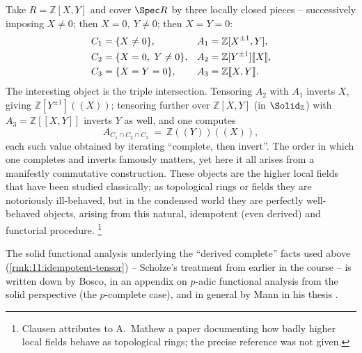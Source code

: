 \begin{example}
\label{ex:11:higher-local-fields}
Take $R=\mathbb{Z}[X,Y]$ and cover $\Spec R$ by three locally closed pieces
-- successively imposing $X\neq0$; then $X=0,\ Y\neq0$; then $X=Y=0$:
\begin{align}
\label{eq:11:hlf-pieces}
C_{1}&=\{X\neq 0\}, & A_{1}&=\mathbb{Z}[X^{\pm1},Y],\notag\\
C_{2}&=\{X=0,\ Y\neq 0\}, & A_{2}&=\mathbb{Z}[Y^{\pm1}][\![X]\!],\\
C_{3}&=\{X=Y=0\}, & A_{3}&=\mathbb{Z}[\![X,Y]\!].\notag
\end{align}
The interesting object is the triple intersection. Tensoring $A_{2}$ with
$A_{1}$ inverts $X$, giving $\mathbb{Z}[Y^{\pm1}](\!(X)\!)$; tensoring further
over $\mathbb{Z}[X,Y]$ (in $\Solid_{\mathbb{Z}}$) with $A_{3}=\mathbb{Z}[\![X,Y]
\!]$ inverts $Y$ as well, and one computes
\begin{equation*}
A_{C_{1}\cap C_{2}\cap C_{3}}\ =\ \mathbb{Z}(\!(Y)\!)(\!(X)\!),
\end{equation*}
each such value obtained by iterating ``complete, then invert''. The order in
which one completes and inverts famously matters, yet here it all arises from a
manifestly commutative construction. These objects are the higher local fields
that have been studied classically; as topological rings or fields they are
notoriously ill-behaved, but in the condensed world they are perfectly
well-behaved objects, arising from this natural, idempotent (even derived) and
functorial procedure.%
\footnote{Clausen attributes to A.~Mathew a paper documenting how badly higher
local fields behave as topological rings; the precise reference was not given.}
\end{example}

\begin{remark}
\label{rmk:11:references}
The solid functional analysis underlying the ``derived complete'' facts used
above (\cref{rmk:11:idempotent-tensor}) -- Scholze's treatment from earlier in
the course -- is written down by Bosco, in an appendix on $p$-adic functional
analysis from the solid perspective \cite{bosco2023rationalpadichodgetheory}
(the $p$-complete case), and in general by Mann in his thesis
\cite{mann2022padic6functorformalismrigidanalytic}.
\end{remark}
